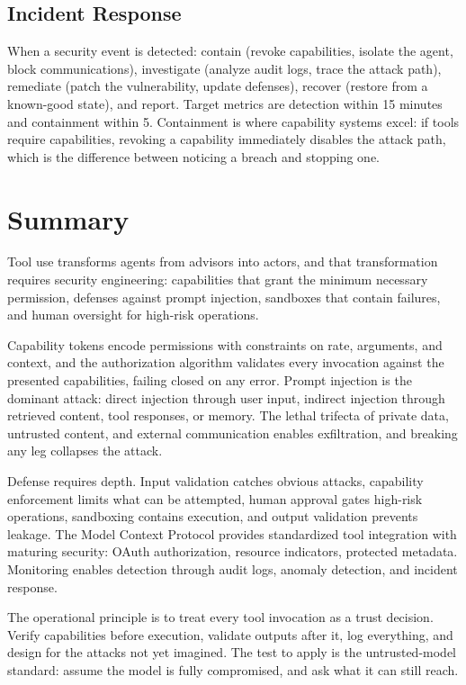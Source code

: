 \documentclass[11pt]{book}
\begin{document}
\subsection{Incident Response}

When a security event is detected: contain (revoke capabilities, isolate the agent, block communications), investigate (analyze audit logs, trace the attack path), remediate (patch the vulnerability, update defenses), recover (restore from a known-good state), and report. Target metrics are detection within 15 minutes and containment within 5. Containment is where capability systems excel: if tools require capabilities, revoking a capability immediately disables the attack path, which is the difference between noticing a breach and stopping one.

\section{Summary}

Tool use transforms agents from advisors into actors, and that transformation requires security engineering: capabilities that grant the minimum necessary permission, defenses against prompt injection, sandboxes that contain failures, and human oversight for high-risk operations.

Capability tokens encode permissions with constraints on rate, arguments, and context, and the authorization algorithm validates every invocation against the presented capabilities, failing closed on any error. Prompt injection is the dominant attack: direct injection through user input, indirect injection through retrieved content, tool responses, or memory. The lethal trifecta of private data, untrusted content, and external communication enables exfiltration, and breaking any leg collapses the attack.

Defense requires depth. Input validation catches obvious attacks, capability enforcement limits what can be attempted, human approval gates high-risk operations, sandboxing contains execution, and output validation prevents leakage. The Model Context Protocol provides standardized tool integration with maturing security: OAuth authorization, resource indicators, protected metadata. Monitoring enables detection through audit logs, anomaly detection, and incident response.

The operational principle is to treat every tool invocation as a trust decision. Verify capabilities before execution, validate outputs after it, log everything, and design for the attacks not yet imagined. The test to apply is the untrusted-model standard: assume the model is fully compromised, and ask what it can still reach.
\end{document}

